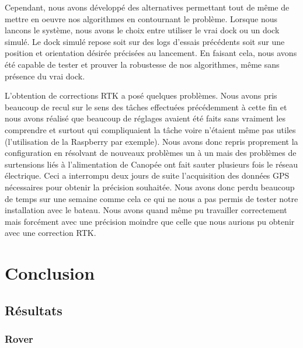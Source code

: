 \documentclass[12pt]{report}
\begin{document}
Cependant, nous avons développé des alternatives permettant tout de même de mettre en oeuvre nos algorithmes en contournant le problème. Lorsque nous lancons le système, nous avons le choix entre
utiliser le vrai dock ou un dock simulé. Le dock simulé repose soit sur des logs d'essais précédents soit sur une position et orientation désirée précisées au lancement. 
En faisant cela, nous avons été capable de tester et prouver la robustesse de nos algorithmes, même sans présence du vrai dock.

L'obtention de corrections RTK a posé quelques problèmes. Nous avons pris beaucoup de recul sur le sens des tâches effectuées précédemment à cette fin et nous avons réalisé que 
beaucoup de réglages avaient été faits sans vraiment les comprendre et surtout qui compliquaient la tâche voire n'étaient même pas utiles (l'utilisation de la Raspberry par exemple).
Nous avons donc repris proprement la configuration en résolvant de nouveaux problèmes un à un mais des problèmes de surtensions liés à l'alimentation de Canopée ont fait sauter plusieurs fois le réseau électrique.
Ceci a interrompu deux jours de suite l'acquisition des données GPS nécessaires pour obtenir la précision souhaitée. Nous avons donc perdu beaucoup de temps sur une semaine comme cela ce qui ne nous a pas permis de tester notre installation avec le bateau.
Nous avons quand même pu travailler correctement mais forcément avec une précision moindre que celle que nous aurions pu obtenir avec une correction RTK.



\chapter{Conclusion}
\section{Résultats}

\subsection{Rover}
\end{document}
